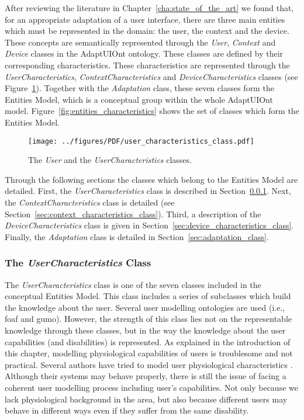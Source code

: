 After reviewing the literature in Chapter~\ref{cha:state_of_the_art} we found
that, for an appropriate adaptation of a user interface, there are three main
entities which must be represented in the domain: the user, the context and the
device. These concepts are semantically represented through the \textit{User},
\textit{Context} and \textit{Device} classes in the AdaptUIOnt ontology. These
classes are defined by their corresponding characteristics. These characteristics 
are represented through the \textit{UserCharacteristics}, \textit{ContextCharacteristics} 
and \textit{DeviceCharacteristics} classes (see Figure~\ref{fig:user_characteristics_class}).
Together with the \textit{Adaptation} class, these seven classes form the Entities
Model, which is a conceptual group within the whole AdaptUIOnt model.
Figure~\ref{fig:entities_characteristics} shows the set of classes which form
the Entities Model.

\begin{figure}
\centering
\texttt{[image: ../figures/PDF/user\_characteristics\_class.pdf]}
\caption{The \textit{User} and the \textit{UserCharacteristics} classes.}
\label{fig:user_characteristics_class}
\end{figure}

Through the following sections the classes which belong to the Entities Model
are detailed. First, the \textit{UserCharacteristics} class is described in
Section~\ref{sec:user_characteristics_class}. Next, the \textit{ContextCharacteristics}
class is detailed (see Section~\ref{sec:context_characteristics_class}). Third,
a description of the \textit{DeviceCharacteristics} class is given in
Section~\ref{sec:device_characteristics_class}. Finally, the \textit{Adaptation}
class is detailed in Section~\ref{sec:adaptation_class}.


\subsubsection{The \textit{UserCharacteristics} Class}
\label{sec:user_characteristics_class}

The \textit{UserCharacteristics} class is one of the seven classes included in
the conceptual Entities Model. This class includes a series of subclasses which
build the knowledge about the user. Several user modelling ontologies are used
(i.e., \ac{foaf} and \ac{gumo}). However, the strength of this class lies not on
the representable knowledge through these classes, but in the way the knowledge
about the user capabilities (and disabilities) is represented. As explained in 
the introduction of this chapter, modelling physiological capabilities of users
is troublesome and not practical. Several authors have tried to model user 
physiological characteristics
\citep{gregor_designing_2002}\citep{razmerita_ontology_based_2003}\citep{pereira_triple_2005}\citep{persad_characterising_2007}\citep{persad_cognitive_2007}\citep{skillen2012ontological}. Although their systems may behave properly, there is still the issue of 
facing a coherent user modelling process including user's capabilities. Not only 
because we lack physiological background in the area, but also because different
users may behave in different ways even if they suffer from the same disability. 

